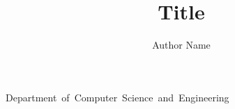 \documentclass{osudissert96}
\begin{document}
\author{Author Name}
\title{Title}
\unit{Department of Computer Science and Engineering}


\makeatletter %
\makeatother

\maketitle %

\disscopyright

\begin{abstract}
  
\end{abstract}







\renewcommand{\lstlistlistingname}{List of Listings\\ \par
\thispagestyle{plain}%
\vspace{6.5ex} %
{\normalsize \hspace{1em} \textbf{Listing} \hfill \textbf{Page}}
\vspace{-5.5ex} %
}

\renewcommand{\listalgorithmname}{List of Algorithms\\ \par
\thispagestyle{plain}%
\vspace{6.5ex} %
{\normalsize \hspace{1em} \textbf{Algorithm} \hfill \textbf{Page}}
\vspace{-5.5ex} %
}

\tableofcontents
\listoftables
\listoffigures
\cleardoublepage %
{} %
\cleardoublepage %
{} %
\end{document}
